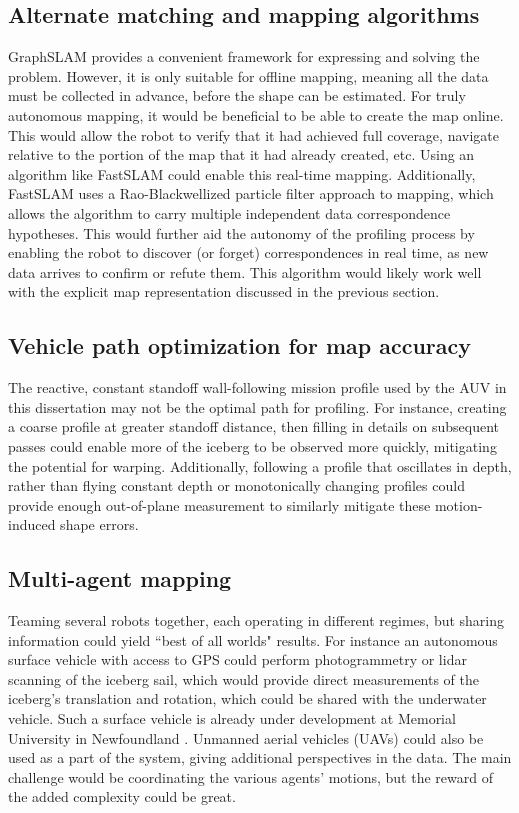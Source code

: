 \subsection{Alternate matching and mapping algorithms}

GraphSLAM provides a convenient framework for expressing and solving the problem. However, it is only suitable for offline mapping, meaning all the data must be collected in advance, before the shape can be estimated. For truly autonomous mapping, it would be beneficial to be able to create the map online. This would allow the robot to verify that it had achieved full coverage, navigate relative to the portion of the map that it had already created, etc. Using an algorithm like FastSLAM \cite{Montemerlo2002} could enable this real-time mapping. Additionally, FastSLAM uses a Rao-Blackwellized particle filter approach to mapping, which allows the algorithm to carry multiple independent data correspondence hypotheses. This would further aid the autonomy of the profiling process by enabling the robot to discover (or forget) correspondences in real time, as new data arrives to confirm or refute them. This algorithm would likely work well with the explicit map representation discussed in the previous section.

\subsection{Vehicle path optimization for map accuracy}
The reactive, constant standoff wall-following mission profile used by the AUV in this dissertation may not be the optimal path for profiling. For instance, creating a coarse profile at greater standoff distance, then filling in details on subsequent passes could enable more of the iceberg to be observed more quickly, mitigating the potential for warping. Additionally, following a profile that oscillates in depth, rather than flying constant depth or monotonically changing profiles could provide enough out-of-plane measurement to similarly mitigate these motion-induced shape errors. 

\subsection{Multi-agent mapping}
Teaming several robots together, each operating in different regimes, but sharing information could yield ``best of all worlds" results. For instance an autonomous surface vehicle with access to GPS could perform photogrammetry or lidar scanning of the iceberg sail, which would provide direct measurements of the iceberg's translation and rotation, which could be shared with the underwater vehicle. Such a surface vehicle is already under development at Memorial University in Newfoundland \cite{Smith2014}. Unmanned aerial vehicles (UAVs) could also be used as a part of the system, giving additional perspectives in the data. The main challenge would be coordinating the various agents' motions, but the reward of the added complexity could be great. 

